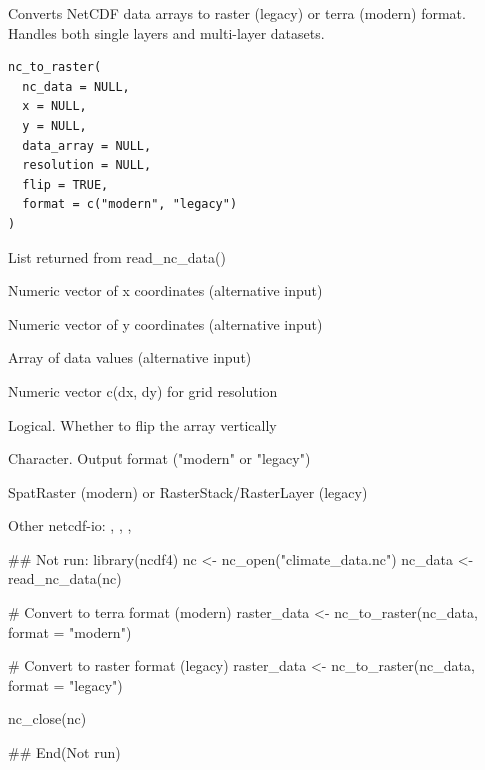 \documentclass[a4paper]{book}
\begin{document}
%
\begin{Description}\relax
Converts NetCDF data arrays to raster (legacy) or terra (modern) format.
Handles both single layers and multi-layer datasets.
\end{Description}
%
\begin{Usage}
\begin{verbatim}
nc_to_raster(
  nc_data = NULL,
  x = NULL,
  y = NULL,
  data_array = NULL,
  resolution = NULL,
  flip = TRUE,
  format = c("modern", "legacy")
)
\end{verbatim}
\end{Usage}
%
\begin{Arguments}
\begin{ldescription}
\item[\code{nc\_data}] List returned from read\_nc\_data()

\item[\code{x}] Numeric vector of x coordinates (alternative input)

\item[\code{y}] Numeric vector of y coordinates (alternative input)

\item[\code{data\_array}] Array of data values (alternative input)

\item[\code{resolution}] Numeric vector c(dx, dy) for grid resolution

\item[\code{flip}] Logical. Whether to flip the array vertically

\item[\code{format}] Character. Output format ("modern" or "legacy")
\end{ldescription}
\end{Arguments}
%
\begin{Value}
SpatRaster (modern) or RasterStack/RasterLayer (legacy)
\end{Value}
%
\begin{SeeAlso}\relax
Other netcdf-io: 
,
,
,
\end{SeeAlso}
%
\begin{Examples}
\begin{ExampleCode}
## Not run: 
library(ncdf4)
nc <- nc_open("climate_data.nc")
nc_data <- read_nc_data(nc)

# Convert to terra format (modern)
raster_data <- nc_to_raster(nc_data, format = "modern")

# Convert to raster format (legacy)
raster_data <- nc_to_raster(nc_data, format = "legacy")

nc_close(nc)

## End(Not run)
\end{ExampleCode}
\end{Examples}
\end{document}
